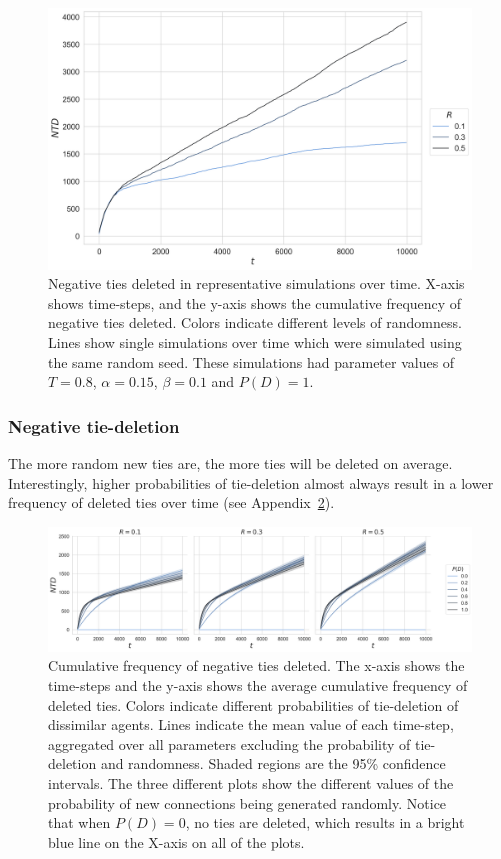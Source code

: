 \documentclass[11pt]{article}
\begin{document}
\begin{figure}[H]
    \centering
    \includegraphics[width=.7\linewidth]{../plots/example/Example_Negative_Ties_Deleted.png}
  \caption{Negative ties deleted in representative simulations over time. X-axis shows time-steps, and the y-axis shows the cumulative frequency of negative ties deleted. Colors indicate different levels of randomness. Lines show single simulations over time which were simulated using the same random seed. These simulations had parameter values of $T = 0.8$, $\alpha = 0.15$, $\beta = 0.1$ and $P(D)=1$.}
  \label{appendix:example_ntd}
\end{figure}

\subsubsection{Negative tie-deletion}
The more random new ties are, the more ties will be deleted on average. Interestingly, higher probabilities of tie-deletion almost always result in a lower frequency of deleted ties over time (see Appendix~\ref{appendix:ntd}).

\begin{figure}[H]
    \centering
    \includegraphics[width=.98\linewidth]{../plots/overall/Negative_Tie_Deleted.png}
  \caption{Cumulative frequency of negative ties deleted. The x-axis shows the time-steps and the y-axis shows the average cumulative frequency of deleted ties. Colors indicate different probabilities of tie-deletion of dissimilar agents. Lines indicate the mean value of each time-step, aggregated over all parameters excluding the probability of tie-deletion and randomness. Shaded regions are the 95\% confidence intervals. The three different plots show the different values of the probability of new connections being generated randomly. Notice that when $P(D) = 0$, no ties are deleted, which results in a bright blue line on the X-axis on all of the plots.}
  \label{appendix:ntd}
\end{figure}
\end{document}
